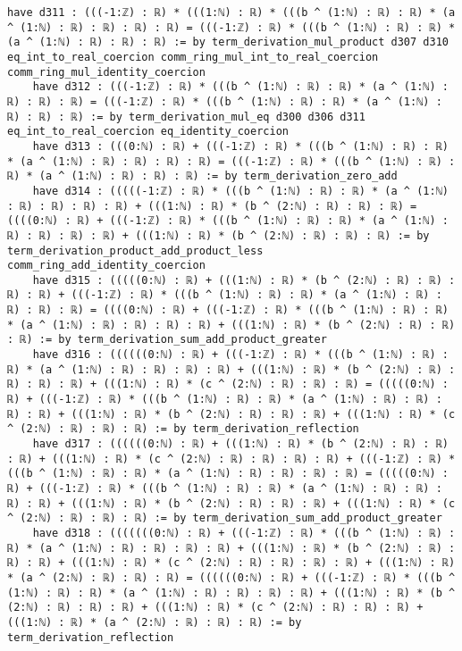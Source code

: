 \documentclass{article}
\begin{document}
\begin{tcolorbox}[colback=white!10, width=\linewidth]
\begin{lstlisting}[language=Lean4]
    have d311 : (((-1:ℤ) : ℝ) * (((1:ℕ) : ℝ) * (((b ^ (1:ℕ) : ℝ) : ℝ) * (a ^ (1:ℕ) : ℝ) : ℝ) : ℝ) : ℝ) = (((-1:ℤ) : ℝ) * (((b ^ (1:ℕ) : ℝ) : ℝ) * (a ^ (1:ℕ) : ℝ) : ℝ) : ℝ) := by term_derivation_mul_product d307 d310 eq_int_to_real_coercion comm_ring_mul_int_to_real_coercion comm_ring_mul_identity_coercion
    have d312 : (((-1:ℤ) : ℝ) * (((b ^ (1:ℕ) : ℝ) : ℝ) * (a ^ (1:ℕ) : ℝ) : ℝ) : ℝ) = (((-1:ℤ) : ℝ) * (((b ^ (1:ℕ) : ℝ) : ℝ) * (a ^ (1:ℕ) : ℝ) : ℝ) : ℝ) := by term_derivation_mul_eq d300 d306 d311 eq_int_to_real_coercion eq_identity_coercion
    have d313 : (((0:ℕ) : ℝ) + (((-1:ℤ) : ℝ) * (((b ^ (1:ℕ) : ℝ) : ℝ) * (a ^ (1:ℕ) : ℝ) : ℝ) : ℝ) : ℝ) = (((-1:ℤ) : ℝ) * (((b ^ (1:ℕ) : ℝ) : ℝ) * (a ^ (1:ℕ) : ℝ) : ℝ) : ℝ) := by term_derivation_zero_add
    have d314 : (((((-1:ℤ) : ℝ) * (((b ^ (1:ℕ) : ℝ) : ℝ) * (a ^ (1:ℕ) : ℝ) : ℝ) : ℝ) : ℝ) + (((1:ℕ) : ℝ) * (b ^ (2:ℕ) : ℝ) : ℝ) : ℝ) = ((((0:ℕ) : ℝ) + (((-1:ℤ) : ℝ) * (((b ^ (1:ℕ) : ℝ) : ℝ) * (a ^ (1:ℕ) : ℝ) : ℝ) : ℝ) : ℝ) + (((1:ℕ) : ℝ) * (b ^ (2:ℕ) : ℝ) : ℝ) : ℝ) := by term_derivation_product_add_product_less comm_ring_add_identity_coercion
    have d315 : (((((0:ℕ) : ℝ) + (((1:ℕ) : ℝ) * (b ^ (2:ℕ) : ℝ) : ℝ) : ℝ) : ℝ) + (((-1:ℤ) : ℝ) * (((b ^ (1:ℕ) : ℝ) : ℝ) * (a ^ (1:ℕ) : ℝ) : ℝ) : ℝ) : ℝ) = ((((0:ℕ) : ℝ) + (((-1:ℤ) : ℝ) * (((b ^ (1:ℕ) : ℝ) : ℝ) * (a ^ (1:ℕ) : ℝ) : ℝ) : ℝ) : ℝ) + (((1:ℕ) : ℝ) * (b ^ (2:ℕ) : ℝ) : ℝ) : ℝ) := by term_derivation_sum_add_product_greater
    have d316 : ((((((0:ℕ) : ℝ) + (((-1:ℤ) : ℝ) * (((b ^ (1:ℕ) : ℝ) : ℝ) * (a ^ (1:ℕ) : ℝ) : ℝ) : ℝ) : ℝ) + (((1:ℕ) : ℝ) * (b ^ (2:ℕ) : ℝ) : ℝ) : ℝ) : ℝ) + (((1:ℕ) : ℝ) * (c ^ (2:ℕ) : ℝ) : ℝ) : ℝ) = (((((0:ℕ) : ℝ) + (((-1:ℤ) : ℝ) * (((b ^ (1:ℕ) : ℝ) : ℝ) * (a ^ (1:ℕ) : ℝ) : ℝ) : ℝ) : ℝ) + (((1:ℕ) : ℝ) * (b ^ (2:ℕ) : ℝ) : ℝ) : ℝ) + (((1:ℕ) : ℝ) * (c ^ (2:ℕ) : ℝ) : ℝ) : ℝ) := by term_derivation_reflection
    have d317 : ((((((0:ℕ) : ℝ) + (((1:ℕ) : ℝ) * (b ^ (2:ℕ) : ℝ) : ℝ) : ℝ) + (((1:ℕ) : ℝ) * (c ^ (2:ℕ) : ℝ) : ℝ) : ℝ) : ℝ) + (((-1:ℤ) : ℝ) * (((b ^ (1:ℕ) : ℝ) : ℝ) * (a ^ (1:ℕ) : ℝ) : ℝ) : ℝ) : ℝ) = (((((0:ℕ) : ℝ) + (((-1:ℤ) : ℝ) * (((b ^ (1:ℕ) : ℝ) : ℝ) * (a ^ (1:ℕ) : ℝ) : ℝ) : ℝ) : ℝ) + (((1:ℕ) : ℝ) * (b ^ (2:ℕ) : ℝ) : ℝ) : ℝ) + (((1:ℕ) : ℝ) * (c ^ (2:ℕ) : ℝ) : ℝ) : ℝ) := by term_derivation_sum_add_product_greater
    have d318 : (((((((0:ℕ) : ℝ) + (((-1:ℤ) : ℝ) * (((b ^ (1:ℕ) : ℝ) : ℝ) * (a ^ (1:ℕ) : ℝ) : ℝ) : ℝ) : ℝ) + (((1:ℕ) : ℝ) * (b ^ (2:ℕ) : ℝ) : ℝ) : ℝ) + (((1:ℕ) : ℝ) * (c ^ (2:ℕ) : ℝ) : ℝ) : ℝ) : ℝ) + (((1:ℕ) : ℝ) * (a ^ (2:ℕ) : ℝ) : ℝ) : ℝ) = ((((((0:ℕ) : ℝ) + (((-1:ℤ) : ℝ) * (((b ^ (1:ℕ) : ℝ) : ℝ) * (a ^ (1:ℕ) : ℝ) : ℝ) : ℝ) : ℝ) + (((1:ℕ) : ℝ) * (b ^ (2:ℕ) : ℝ) : ℝ) : ℝ) + (((1:ℕ) : ℝ) * (c ^ (2:ℕ) : ℝ) : ℝ) : ℝ) + (((1:ℕ) : ℝ) * (a ^ (2:ℕ) : ℝ) : ℝ) : ℝ) := by term_derivation_reflection

\end{lstlisting}
\end{tcolorbox}
\end{document}
